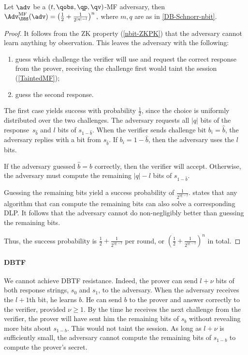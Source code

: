 \begin{theorem}
  Let \(\adv\) be a \((t, \qobs, \qp, \qv)\)-MF adversary, then \(
    \Adv_{\DBS}^{\text{MF}}(\adv) =
      \left(\frac{1}{2} + \frac{1}{2^{|q|-l}}\right)^n,
  \) where \(m, q\) are as in \cref{DB-Schnorr-nbit}.
\end{theorem}

\begin{proof}
  It follows from the \ac{ZK} property (\cref{nbit-ZKPK}) that the adversary 
  cannot learn anything by observation.
  This leaves the adversary with the following:
  \begin{enumerate}
    \item guess which challenge the verifier will use and request the correct 
      response from the prover, receiving the challenge first would taint the 
      session (\cref{TaintedMF});
    \item guess the second response.
  \end{enumerate}

  The first case yields success with probability \(\frac{1}{2}\), since the 
  choice is uniformly distributed over the two challenges.
  The adversary requests all \(|q|\) bits of the response~\(s_{\hat b}\) and 
  \(l\) bits of \(s_{1-\hat b}\).
  When the verifier sends challenge bit \(b_i = \hat b\), the adversary replies 
  with a bit from \(s_{\hat b}\).
  If \(b_i = 1-\hat b\), then the adversary uses the \(l\) bits.

  If the adversary guessed \(\hat b = b\) correctly, then the verifier will 
  accept.
  Otherwise, the adversary must compute the remaining \(|q|-l\) bits of 
  \(s_{1-\hat b}\).

  Guessing the remaining bits yield a success probability of 
  \(\frac{1}{2^{|q|-l}}\).
   states that any algorithm that can compute the remaining 
  bits can also solve a corresponding \ac{DLP}.
  It follows that the adversary cannot do non-negligibly better than guessing 
  the remaining bits.

  Thus, the success probability is \(\frac{1}{2}+\frac{1}{2^{|q|-l}}\) per 
  round, or \(\left(\frac{1}{2}+\frac{1}{2^{|q|-l}}\right)^n\) in total.
\end{proof}

\paragraph{\Acl{DBTF}}

We cannot achieve \ac{DBTF} resistance.
Indeed, the prover can send \(l+\nu\) bits of both response strings, \(s_0\) 
and \(s_1\), to the adversary.
When the adversary receives the \(l+1\)th bit, he learns \(b\).
He can send \(b\) to the prover and answer correctly to the verifier, provided 
\(\nu \geq 1\).
By the time he receives the next challenge from the verifier, the prover will 
have sent him the remaining bits of \(s_b\) without revealing more bits about 
\(s_{1-b}\).
This would not taint the session.
As long as \(l+\nu\) is sufficiently small, the adversary cannot compute the 
remaining bits of \(s_{1-b}\) to compute the prover's secret.

